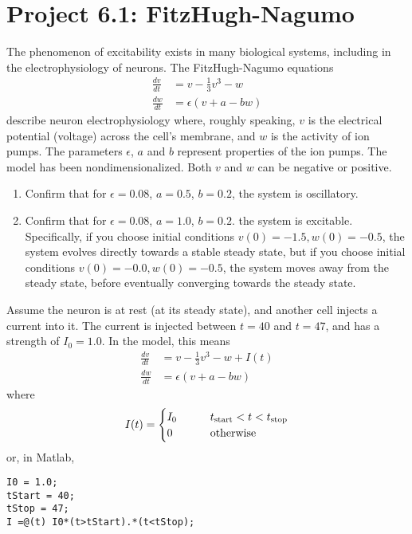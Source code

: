 \documentclass{exam}
\begin{document}
\section*{Project 6.1: FitzHugh-Nagumo}
 
 
 The phenomenon of excitability exists in many biological systems, including in the electrophysiology of neurons. The FitzHugh-Nagumo equations
 \begin{align}
 \frac{d v}{dt} &= v - \frac{1}{3} v^3 - w \\
 \frac{d w}{dt} &= \epsilon \left( v + a - bw\right)
 \end{align}
 describe neuron electrophysiology where, roughly speaking, $v$ is the electrical potential (voltage) across the cell's membrane, and $w$ is the activity of ion pumps. The parameters $\epsilon$, $a$ and $b$ represent properties of the ion pumps. The model has been nondimensionalized. Both $v$ and $w$ can be negative or positive.
 
 
\begin{enumerate}
\item Confirm that for $\epsilon=0.08$, $a=0.5$, $b=0.2$, the system is oscillatory.
\item Confirm that for $\epsilon=0.08$, $a=1.0$, $b=0.2$. the system is excitable. Specifically, if you choose initial conditions $v(0)=-1.5, w(0)=-0.5$, the system evolves directly towards a stable steady state, but if you choose initial conditions $v(0)=-0.0, w(0)=-0.5$, the system moves away from the steady state, before eventually converging towards the steady state.
\end{enumerate}

Assume the neuron is at rest (at its steady state), and another cell injects a current into it. The current is injected between $t=40$ and $t=47$, and has a strength of $I_0=1.0$. In the model, this means 
 \begin{align}
 \frac{d v}{dt} &= v - \frac{1}{3} v^3 - w +I(t)\\
 \frac{d w}{dt} &= \epsilon \left( v + a - bw\right) 
 \end{align}
 where 
 \begin{equation}
 I(t) = \begin{cases}
 I_0 & \qquad t_{\rm start}<t < t_{\rm stop}\\
 0 & \qquad \mbox{otherwise}
 \end{cases}
 \end{equation}
or, in Matlab,
\begin{lstlisting}
I0 = 1.0;
tStart = 40;
tStop = 47;
I =@(t) I0*(t>tStart).*(t<tStop);
\end{lstlisting}
\end{document}
